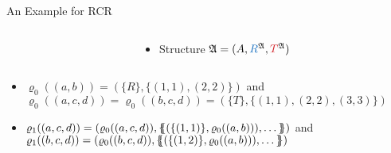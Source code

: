 \documentclass[aspectratio=169]{beamer}
\renewcommand{\rho}{\varrho}
\def\multiset#1{\ensuremath{\left\{\kern-.35em\left\{#1\right\}\kern-.35em\right\}}}
\begin{document}
	\iffalse
	\begin{frame}{The Algorithm}
		\begin{itemize}
			\item For relational structure $\mathfrak A$ and all tuples $\mathbf a\in \mathbf A$:
			\item Initial colour: $\varrho_0(\mathbf a)=(\operatorname{atp}(\mathbf a), \operatorname{stp}(\mathbf a, \mathbf a))$
			\item For the next rounds: $\varrho_{i+1}(\mathbf a)=(\varrho_i(\mathbf a), \multiset{(\operatorname{stp}(\mathbf a,\mathbf b), \varrho_i(\mathbf b)) : \operatorname{stp}(\mathbf a,\mathbf b)\neq \emptyset})$
		\end{itemize}
	\end{frame}
	\fi
	
	\begin{frame}{An Example for RCR}
		\begin{columns}
			\begin{column}{0.25\textwidth}
				\centering
			\end{column}
			\begin{column}{0.75\textwidth}
				\begin{itemize}
					\item Structure $\mathfrak A=(A,\textcolor{rwth-blue}{R}^{\mathfrak A},\textcolor{rwth-red}{T}^{\mathfrak A})$
				\end{itemize}
			\end{column}
		\end{columns}
		\begin{itemize}
			\item $\rho_0((a,b))=(\{R\},\{(1,1),(2,2)\})$ and $\rho_0((a,c,d))=\rho_0((b,c,d))=(\{T\}, \{(1,1),(2,2),(3,3)\})$
			\item $\rho_1((a,c,d))=(\rho_0((a,c,d)), \multiset{(\{(1,1)\}, \rho_0((a,b))), \dots})$
			and 
			$\rho_1((b,c,d))=(\rho_0((b,c,d)), \multiset{(\{(1,2)\}, \rho_0((a,b))), \dots})$
		\end{itemize}
	\end{frame}
	
\end{document}
